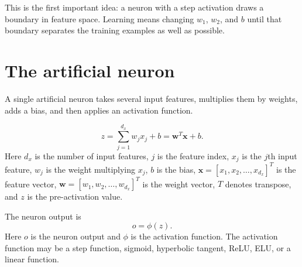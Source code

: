 \documentclass[11pt]{article}
\newcommand{\bx}{\bm{x}}
\begin{document}
This is the first important idea: a neuron with a step activation draws a boundary in feature space.  Learning means changing $w_1$, $w_2$, and $b$ until that boundary separates the training examples as well as possible.

\section{The artificial neuron}

A single artificial neuron takes several input features, multiplies them by weights, adds a bias, and then applies an activation function.

\begin{equation}
    z = \sum_{j=1}^{d_x} w_j x_j + b = \bm{w}^{T}\bx+b.
    \label{eq:neuron_z}
\end{equation}
Here $d_x$ is the number of input features, $j$ is the feature index, $x_j$ is the $j$th input feature, $w_j$ is the weight multiplying $x_j$, $b$ is the bias, $\bx=[x_1,x_2,\ldots,x_{d_x}]^T$ is the feature vector, $\bm{w}=[w_1,w_2,\ldots,w_{d_x}]^T$ is the weight vector, $T$ denotes transpose, and $z$ is the pre-activation value.

The neuron output is
\begin{equation}
    o = \phi(z).
    \label{eq:neuron_o}
\end{equation}
Here $o$ is the neuron output and $\phi$ is the activation function.  The activation function may be a step function, sigmoid, hyperbolic tangent, ReLU, ELU, or a linear function.

\begin{center}
\end{center}
\end{document}

